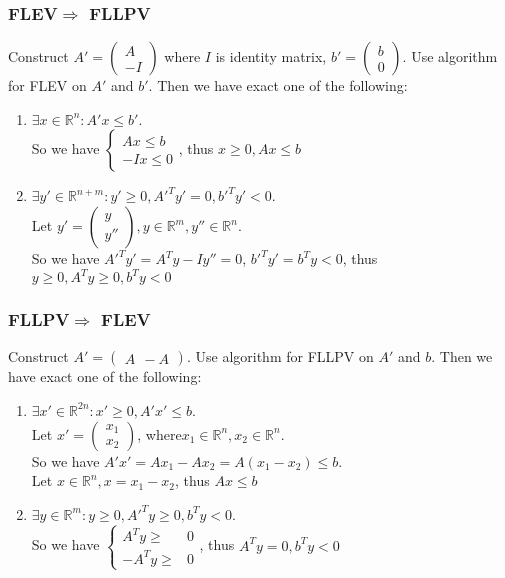 	\subsubsection*{FLEV$\Rightarrow$ FLLPV}
	Construct \boldmath $A'=
	\begin{pmatrix}
	A\\ -I
	\end{pmatrix}$ where $I$ is identity matrix, $b'=\begin{pmatrix}
	b\\ 0
	\end{pmatrix}$. Use algorithm for FLEV on $A'$ and $b'$. Then we have exact one of the following:
	\begin{enumerate}
		\item $\exists x\in \mathbb{R}^n:A'x\leq b'$.\\ So we have $\left\{\begin{aligned}
		Ax\leq b\\
		-Ix\leq 0
		\end{aligned}\right.$, thus $x\geq 0,Ax\leq b$
		\item $\exists y'\in \mathbb{R}^{n+m}:y'\geq 0,A'^Ty'= 0,b'^Ty'<0$.\\ Let $y'=\begin{pmatrix}
		y\\y''
		\end{pmatrix},y\in \mathbb{R}^m,y''\in \mathbb{R}^n$.\\ So we have $A'^Ty'=A^Ty-Iy''=0$, $b'^Ty'=b^Ty<0$, thus $y\geq0,A^Ty\geq 0,b^Ty<0$
	\end{enumerate}
	\subsubsection*{FLLPV$\Rightarrow$ FLEV}
	Construct \boldmath $A'=
	\begin{pmatrix}
	A\ \ -A
	\end{pmatrix}$. Use algorithm for FLLPV on $A'$ and $b$. Then we have exact one of the following:
	\begin{enumerate}
		\item $\exists x'\in \mathbb{R}^{2n}:x'\geq 0,A'x'\leq b$.\\ Let $x'=\begin{pmatrix}
		x_1\\ x_2
		\end{pmatrix}$, where$x_1\in \mathbb{R}^n,x_2\in \mathbb{R}^n$.\\ So we have $A'x'=Ax_1-Ax_2=A(x_1-x_2)\leq b$. \\Let $x\in \mathbb{R}^n,x=x_1-x_2$, thus $Ax\leq b$
		\item $\exists y\in \mathbb{R}^m:y\geq 0,A'^Ty\geq 0,b^Ty<0$.\\ So we have $\left\{\begin{aligned}
		A^Ty\geq& 0\\
		-A^Ty\geq& 0
		\end{aligned}\right.$, thus $A^Ty=0,b^Ty<0$
	\end{enumerate}
